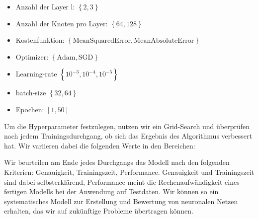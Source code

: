 \begin{itemize}
	\item Anzahl der Layer l: $\left\lbrace2, 3\right\rbrace$  
	\item Anzahl der Knoten pro Layer: $\left\lbrace64, 128 \right\rbrace $
	\item Kostenfunktion: $\left\lbrace \text{MeanSquaredError}, \text{MeanAbsoluteError} \right\rbrace$
	\item Optimizer: $\left\lbrace \text{Adam}, \text{SGD} \right\rbrace$
	\item Learning-rate $\left\lbrace 10^{-3}, 10^{-4}, 10^{-5} \right\rbrace$
	\item batch-size $\left\lbrace 32, 64 \right\rbrace$
	\item Epochen: $\left[1,50\right]$
\end{itemize}

Um die Hyperparameter festzulegen, nutzen wir ein Grid-Search und überprüfen nach jedem Trainingsdurchgang, ob sich das Ergebnis des Algorithmus verbessert hat. Wir variieren dabei die folgenden Werte in den Bereichen:

Wir beurteilen am Ende jedes Durchgangs das Modell nach den folgenden Kriterien: Genauigkeit, Trainingszeit, Performance. Genauigkeit und Trainingszeit sind dabei selbsterklärend, Performance meint die Rechenaufwändigkeit eines fertigen Modells bei der Anwendung auf Testdaten. Wir können so ein systematisches Modell zur Erstellung und Bewertung von neuronalen Netzen erhalten, das wir auf zukünftige Probleme übertragen können.

